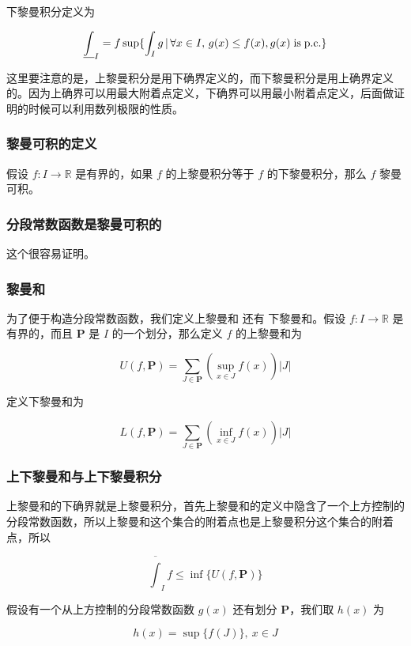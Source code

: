 下黎曼积分定义为

\[
    \underline{\int}_I = f\sup \{ \int_{I} g \,\vert\, \forall x \in I ,\, g(x) \le f(x), g(x) \mathrm{\; is\; p.c.} \}
\]

这里要注意的是，上黎曼积分是用下确界定义的，而下黎曼积分是用上确界定义的。因为上确界可以用最大附着点定义，下确界可以用最小附着点定义，后面做证明的时候可以利用数列极限的性质。


\subsubsection{黎曼可积的定义}

假设 $f: I \to \mathbb{R}$ 是有界的，如果 $f$ 的上黎曼积分等于 $f$ 的下黎曼积分，那么 $f$ 黎曼可积。


\subsubsection{分段常数函数是黎曼可积的}

这个很容易证明。


\subsubsection{黎曼和}

为了便于构造分段常数函数，我们定义上黎曼和 还有 下黎曼和。假设 $f: I \to \mathbb{R}$ 是有界的，而且 $\mathbf{P}$ 是 $I$ 的一个划分，那么定义 $f$ 的上黎曼和为

\[
    U(f, \mathbf{P}) = \sum_{J \in \mathbf{P}} (\sup_{x \in J}f(x)) \lvert J \rvert
\]

定义下黎曼和为

\[
    L(f, \mathbf{P}) = \sum_{J \in \mathbf{P}} (\inf_{x \in J}f(x)) \lvert J \rvert
\]

\subsubsection{上下黎曼和与上下黎曼积分}

上黎曼和的下确界就是上黎曼积分，首先上黎曼和的定义中隐含了一个上方控制的分段常数函数，所以上黎曼和这个集合的附着点也是上黎曼积分这个集合的附着点，所以

\[
    \overline{\int}_I f \le \inf \{ U(f, \mathbf{P}) \}
\]

假设有一个从上方控制的分段常数函数 $g(x)$ 还有划分 $\mathbf{P}$，我们取 $h(x)$ 为

\[
    h(x) = \sup \{ f(J) \}, \: x \in J
\]

